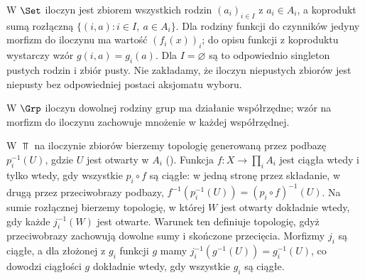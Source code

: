 \begin{przyklad}\label{cat:ex:indexed-set-top}
W $\Set$ iloczyn jest zbiorem wszystkich rodzin $(a_i)_{i\in I}$ z $a_i\in A_i$, a koprodukt sumą rozłączną $\{(i,a):i\in I,\ a\in A_i\}$. Dla rodziny funkcji do czynników jedyny morfizm do iloczynu ma wartość $(f_i(x))_i$; do opisu funkcji z koproduktu wystarczy wzór $g(i,a)=g_i(a)$. Dla $I=\varnothing$ są to odpowiednio singleton pustych rodzin i zbiór pusty. Nie zakładamy, że iloczyn niepustych zbiorów jest niepusty bez odpowiedniej postaci aksjomatu wyboru.

W $\Grp$ iloczyn dowolnej rodziny grup ma działanie współrzędne; wzór na morfizm do iloczynu zachowuje mnożenie w każdej współrzędnej.

W $\Top$ na iloczynie zbiorów bierzemy topologię generowaną przez podbazę $p_i^{-1}(U)$, gdzie $U$ jest otwarty w $A_i$ (). Funkcja $f:X\to\prod_i A_i$ jest ciągła wtedy i tylko wtedy, gdy wszystkie $p_i\circ f$ są ciągłe: w jedną stronę przez składanie, w drugą przez przeciwobrazy podbazy, $f^{-1}(p_i^{-1}(U))=(p_i\circ f)^{-1}(U)$. Na sumie rozłącznej bierzemy topologię, w której $W$ jest otwarty dokładnie wtedy, gdy każde $j_i^{-1}(W)$ jest otwarte. Warunek ten definiuje topologię, gdyż przeciwobrazy zachowują dowolne sumy i skończone przecięcia. Morfizmy $j_i$ są ciągłe, a dla złożonej z $g_i$ funkcji $g$ mamy $j_i^{-1}(g^{-1}(U))=g_i^{-1}(U)$, co dowodzi ciągłości $g$ dokładnie wtedy, gdy wszystkie $g_i$ są ciągłe.
\end{przyklad}

